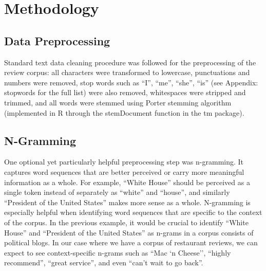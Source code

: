\documentclass[12pt,twoside]{dukestatscithesis}
\theoremstyle{definition}
\theoremstyle{definition}
\theoremstyle{definition}
\theoremstyle{remark}
\begin{document}
\chapter{Methodology}\label{methods}

\section{Data Preprocessing}\label{data-preprocessing}

Standard text data cleaning procedure was followed for the preprocessing
of the review corpus: all characters were transformed to lowercase,
punctuations and numbers were removed, stop words such as ``I'', ``me'',
``she'', ``is'' (see Appendix: stopwords for the full list) were also
removed, whitespaces were stripped and trimmed, and all words were
stemmed using Porter stemming algorithm (implemented in R through the
stemDocument function in the tm package).

\section{N-Gramming}\label{n-gramming}

One optional yet particularly helpful preprocessing step was n-gramming.
It captures word sequences that are better perceived or carry more
meaningful information as a whole. For example, ``White House'' should
be perceived as a single token instead of separately as ``white'' and
``house'', and similarly ``President of the United States'' makes more
sense as a whole. N-gramming is especially helpful when identifying word
sequences that are specific to the context of the corpus. In the
previous example, it would be crucial to identify ``White House'' and
``President of the United States'' as n-grams in a corpus consists of
political blogs. In our case where we have a corpus of restaurant
reviews, we can expect to see context-specific n-grams such as ``Mac `n
Cheese'', ``highly recommend'', ``great service'', and even ``can't wait
to go back''.
\end{document}
